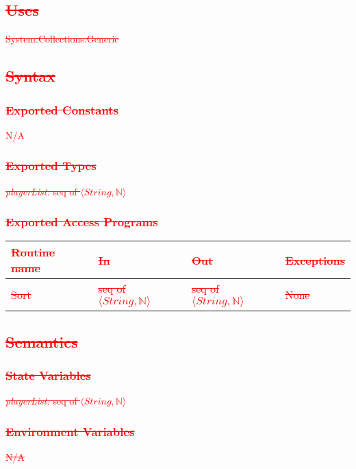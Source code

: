 \documentclass[12pt]{article}
\begin{document}
\subsection{\textcolor{red}{\sout{Uses}}}
\textcolor{red}{\sout{System.Collections.Generic}}

\subsection{\textcolor{red}{\sout{Syntax}}}
\subsubsection{\textcolor{red}{\sout{Exported Constants}}}
\textcolor{red}{N/A}

\subsubsection{\textcolor{red}{\sout{Exported Types}}}
\textcolor{red}{\sout{\textit{playerList:} seq of $\langle String, \mathbb{N} \rangle$}}

\subsubsection{\textcolor{red}{\sout{Exported Access Programs}}}
\begin{tabular}{| l | l | l | l |}
\hline
\textcolor{red}{\sout{\textbf{Routine name}}} & \textcolor{red}{\sout{\textbf{In}}} & \textcolor{red}{\sout{\textbf{Out}}} & \textcolor{red}{\sout{\textbf{Exceptions}}}\\
\hline
\textcolor{red}{\sout{Sort}} & \textcolor{red}{\sout{seq of $\langle String, \mathbb{N} \rangle$}} & \textcolor{red}{\sout{seq of $\langle String, \mathbb{N} \rangle$}} & \textcolor{red}{\sout{None}}\\
\hline
\end{tabular}

\subsection{\textcolor{red}{\sout{Semantics}}}
\subsubsection{\textcolor{red}{\sout{State Variables}}}
\textcolor{red}{\sout{\textit{playerList:} seq of $\langle String, \mathbb{N} \rangle$}}

\subsubsection{\textcolor{red}{\sout{Environment Variables}}}
\textcolor{red}{\sout{N/A}}
\end{document}
